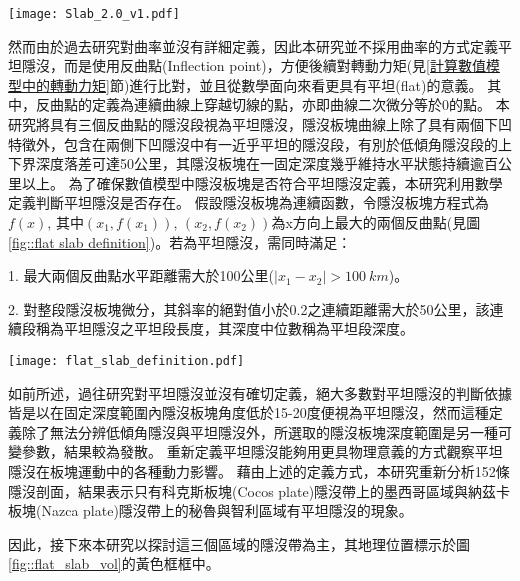 \begin{figure*}[ht!]
    \centering
    \texttt{[image: Slab\_2.0\_v1.pdf]}
    \caption[slab 2.0 模型與四條參考剖面，改編自\citealp{schellart2020control}]{slab 2.0 模型與四條參考剖面，改編自\citealp{schellart2020control}。其中(a)為馬尼拉隱沒帶剖面，(b)為阿拉斯加隱沒帶剖面，(c)為加勒比板塊隱沒帶剖面，(d)為秘魯隱沒帶剖面。}
    \label{fig::slab profile}
\end{figure*}


然而由於過去研究對曲率並沒有詳細定義，因此本研究並不採用曲率的方式定義平坦隱沒，而是使用反曲點(Inflection point)，方便後續對轉動力矩(見\ref{計算數值模型中的轉動力矩}節)進行比對，並且從數學面向來看更具有平坦(flat)的意義。
其中，反曲點的定義為連續曲線上穿越切線的點，亦即曲線二次微分等於0的點。
本研究將具有三個反曲點的隱沒段視為平坦隱沒，隱沒板塊曲線上除了具有兩個下凹特徵外，包含在兩側下凹隱沒中有一近乎平坦的隱沒段，有別於低傾角隱沒段的上下界深度落差可達50公里，其隱沒板塊在一固定深度幾乎維持水平狀態持續逾百公里以上。
為了確保數值模型中隱沒板塊是否符合平坦隱沒定義，本研究利用數學定義判斷平坦隱沒是否存在。
假設隱沒板塊為連續函數，令隱沒板塊方程式為$f(x)$, 其中$(x_{1},f(x_{1}))$, $(x_{2},f(x_{2}))$為x方向上最大的兩個反曲點(見圖\ref{fig::flat slab definition})。若為平坦隱沒，需同時滿足：

1. 最大兩個反曲點水平距離需大於100公里($\mid x_{1}-x_{2}\mid > 100 \ km$)。

2. 對整段隱沒板塊微分，其斜率的絕對值小於0.2之連續距離需大於50公里，該連續段稱為平坦隱沒之平坦段長度，其深度中位數稱為平坦段深度。

\begin{figure*}[ht!]
    \centering
    \texttt{[image: flat\_slab\_definition.pdf]}
    \caption[本研究中平坦隱沒的定義示意圖]{本研究中平坦隱沒的定義示意圖。}
    \label{fig::flat slab definition}
\end{figure*}

如前所述，過往研究對平坦隱沒並沒有確切定義，絕大多數對平坦隱沒的判斷依據皆是以在固定深度範圍內隱沒板塊角度低於15-20度便視為平坦隱沒，然而這種定義除了無法分辨低傾角隱沒與平坦隱沒外，所選取的隱沒板塊深度範圍是另一種可變參數，結果較為發散。
重新定義平坦隱沒能夠用更具物理意義的方式觀察平坦隱沒在板塊運動中的各種動力影響。
藉由上述的定義方式，本研究重新分析152條隱沒剖面，結果表示只有科克斯板塊(Cocos plate)隱沒帶上的墨西哥區域與納茲卡板塊(Nazca plate)隱沒帶上的秘魯與智利區域有平坦隱沒的現象。

因此，接下來本研究以探討這三個區域的隱沒帶為主，其地理位置標示於圖\ref{fig::flat_slab_vol}的黃色框框中。

